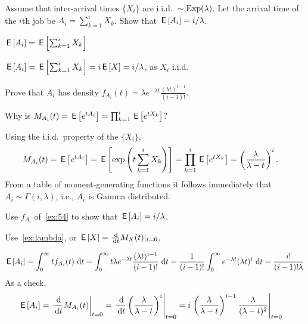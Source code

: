 \begin{exercise}\label{ex:30}
 Assume  that inter-arrival times $\{X_i\}$ are i.i.d.\ $\sim\operatorname{Exp}(\lambda)$. Let
the arrival time of the $i$th job be $A_i=\sum_{k=1}^i X_k$. Show that 
$\,\mathsf{E}\left[A_i\right] = i/\lambda$.
\begin{hint} 
$\,\mathsf{E}\left[A_i\right] = \,\mathsf{E}\left[\sum_{k=1}^i X_k\right]$
\end{hint}
\begin{solution}
$\,\mathsf{E}\left[A_i\right] = \,\mathsf{E}\left[\sum_{k=1}^i X_k\right] = i \,\mathsf{E}\left[X\right] =  i/ \lambda$, as $X_i$ i.i.d.
\end{solution}
\end{exercise}

\begin{exercise}\label{ex:54}
 Prove that $A_i$ has density 
$f_{A_i}(t) = \lambda e^{-\lambda t} \frac{(\lambda t)^{i-1}}{(i-1)!}$.
\begin{hint}
Why is $M_{A_i}(t) = \,\mathsf{E}\left[e^{t A_i}\right] = \prod_{k=1}^{i} \,\mathsf{E}\left[e^{tX_k}\right]$?
\end{hint}
\begin{solution}
 Using the i.i.d.\ property of the $\{X_i\}$,
\begin{align*}
 M_{A_i}(t) &= \,\mathsf{E}\left[e^{t A_i}\right] = \,\mathsf{E}\left[\exp\left(t\sum_{k=1}^{i} X_k\right)\right]  = \prod_{k=1}^{i} \,\mathsf{E}\left[e^{tX_k}\right] = 
  \left(\frac{\lambda}{\lambda -t }\right)^i.
\end{align*}
From a table of moment-generating functions it follows immediately that
$A_i \sim \Gamma(i,\lambda)$, i.e., $A_i$ is Gamma distributed.
\end{solution}
\end{exercise}

\begin{exercise}
 Use   $f_{A_i}$ of~\cref{ex:54} to show that $\,\mathsf{E}\left[A_i\right]=i/\lambda$. 
\begin{hint}
Use~\cref{ex:lambda}, or $\E X = \frac{\d}{\d t} M_X(t) |_{t=0}$. 
\end{hint}
\begin{solution}
 \begin{equation*}
\,\mathsf{E}\left[A_i\right] = \int_0^\infty t f_{A_i} (t) \, \,\textrm{d}t = 
\int_0^\infty t \lambda e^{-\lambda t} \frac{(\lambda t)^{i-1}}{(i-1)!}\, \,\textrm{d}t = \frac{1}{(i-1)!} \int_0^\infty e^{-\lambda t} (\lambda t)^i\,\,\textrm{d}t = \frac{i!}{(i-1)!\lambda}
\end{equation*}
As a check, 
\begin{align*}
 \E{A_i} 
&= \left.\frac{\d}{\d t} M_{A_i}(t)\right|_{t=0} 
= \left.\frac{\d}{\d t} \left(\frac{\lambda}{\lambda-t}\right)^i\right|_{t=0} 
= i \left.\left(\frac{\lambda}{\lambda-t}\right)^{i-1}\frac{\lambda}{(\lambda-t)^2}\right|_{t=0} 
\end{align*}


\end{solution}
\end{exercise}

